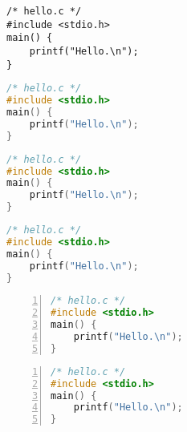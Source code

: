 \documentclass{article}
\begin{document}
\begin{lstlisting}
/* hello.c */
#include <stdio.h>
main() {
    printf("Hello.\n");
}
\end{lstlisting}

\begin{lstlisting}[language=C]
/* hello.c */
#include <stdio.h>
main() {
    printf("Hello.\n");
}
\end{lstlisting}

\begin{lstlisting}[basicstyle=\sffamily,
    keywordstyle=\bfseries,
    commentstyle=\rmfamily\itshape,
    stringstyle=\ttfamily,language=C]
/* hello.c */
#include <stdio.h>
main() {
    printf("Hello.\n");
}
\end{lstlisting}

\begin{lstlisting}[language=C,flexiblecolumns]
/* hello.c */
#include <stdio.h>
main() {
    printf("Hello.\n");
}
\end{lstlisting}

\begin{lstlisting}[language=C,columns=flexible,numbers=left,numberstyle=\footnotesize]
/* hello.c */
#include <stdio.h>
main() {
    printf("Hello.\n");
}
\end{lstlisting}

\begin{lstlisting}[language=C,columns=flexible,numbers=left,numberstyle=\zihao{7},basicstyle=\ttfamily]
/* hello.c */
#include <stdio.h>
main() {
    printf("Hello.\n");
}
\end{lstlisting}
\end{document}
